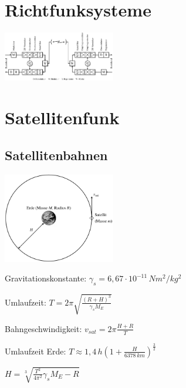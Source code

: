 \documentclass[german]{latex4ei/latex4ei_sheet}
\begin{document}
\section{Richtfunksysteme}
    \begin{sectionbox}
        \item \includegraphics[width=185px]{img/Richtfunk.png}
    \end{sectionbox}
\section{Satellitenfunk}
    \begin{sectionbox}{\subsection{Satellitenbahnen}}
       \item \includegraphics[width=185px]{img/Satellitenumlauf.png}
       \item Gravitationskonstante: $\gamma_s = 6,67\cdot 10^{-11}\, Nm^2/kg^2$
       \item Umlaufzeit: $T = 2\pi \sqrt{\frac{(R+H)^3}{\gamma_s M_E}}$
       \item Bahngeschwindigkeit: $v_{sat} = 2\pi \frac{H+R}{T}$
       \item Umlaufzeit Erde: $T \approx 1,4\,h \left( 1+\frac{H}{6378\,km}\right)^{\frac{3}{2}}$
       \item $H = \sqrt[3]{\frac{T^2}{4\pi^2}\gamma_s M_E - R}$
    \end{sectionbox}
\end{document}
